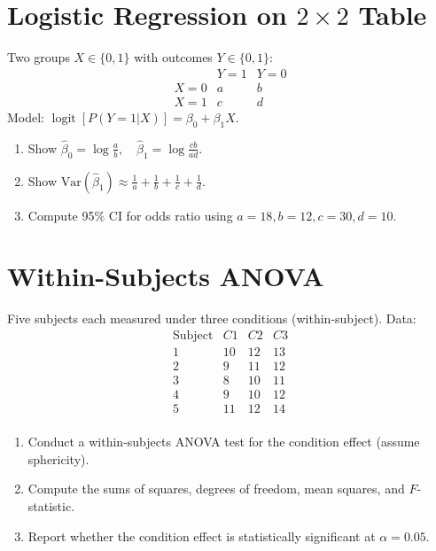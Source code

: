 \documentclass[12pt,a4paper]{article}
\DeclareMathOperator{\logit}{logit}
\begin{document}
\section{Logistic Regression on \( 2 \times 2 \) Table}
Two groups \( X \in \{0,1\} \) with outcomes \( Y \in \{0,1\} \):
\[
\begin{array}{c|cc}
 & Y=1 & Y=0 \\
\hline
X=0 & a & b \\
X=1 & c & d
\end{array}
\]
Model: \( \logit[P(Y=1|X)] = \beta_0 + \beta_1 X \).
\begin{enumerate}[label=(\alph*)]
\item Show \( \hat{\beta}_0 = \log\frac{a}{b}, \quad \hat{\beta}_1 = \log\frac{cb}{ad} \).
\item Show \( \mathrm{Var}(\hat{\beta}_1) \approx \frac{1}{a} + \frac{1}{b} + \frac{1}{c} + \frac{1}{d} \).
\item Compute 95\% CI for odds ratio using \( a=18,b=12,c=30,d=10 \).
\end{enumerate}


\section{Within-Subjects ANOVA}
Five subjects each measured under three conditions (within-subject). Data:
\[
\begin{array}{c|ccc}
\text{Subject} & C1 & C2 & C3 \\
\hline
1 & 10 & 12 & 13 \\
2 & 9 & 11 & 12 \\
3 & 8 & 10 & 11 \\
4 & 9 & 10 & 12 \\
5 & 11 & 12 & 14 \\
\end{array}
\]
\begin{enumerate}[label=(\arabic*)]
\item Conduct a within-subjects ANOVA test for the condition effect (assume sphericity).
\item Compute the sums of squares, degrees of freedom, mean squares, and \( F \)-statistic.
\item Report whether the condition effect is statistically significant at \( \alpha = 0.05 \).
\end{enumerate}
\end{document}
